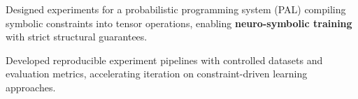     \vspace{0.10 cm}
    \begin{onecolentry}
        \begin{highlights}
    
    \item Designed experiments for a probabilistic programming system (PAL) compiling symbolic constraints into tensor operations, enabling \textbf{neuro-symbolic training} with strict structural guarantees.

    \item Developed reproducible experiment pipelines with controlled datasets and evaluation metrics, accelerating iteration on constraint-driven learning approaches.

        
        \end{highlights}
    \end{onecolentry}
